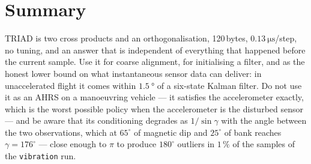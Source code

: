 \section{Summary}
TRIAD is two cross products and an orthogonalisation, 120\,bytes,
$\SI{0.13}{\micro\second}$/step, no tuning, and an answer that is independent of everything that
happened before the current sample. Use it for coarse alignment, for initialising a filter, and as
the honest lower bound on what instantaneous sensor data can deliver: in unaccelerated flight it
comes within $\SI{1.5}{\degree}$ of a six-state Kalman filter. Do not use it as an AHRS on a manoeuvring vehicle --- it satisfies the
accelerometer exactly, which is the worst possible policy when the accelerometer is the disturbed
sensor --- and be aware that its conditioning degrades as $1/\sin\gamma$ with the angle between the
two observations, which at $65^\circ$ of magnetic dip and $25^\circ$ of bank reaches
$\gamma=176^\circ$ --- close enough to $\pi$ to produce $180^\circ$ outliers in $1\,\%$ of the
samples of the \texttt{vibration} run.
